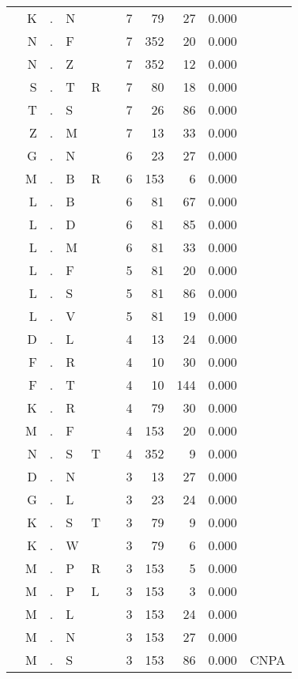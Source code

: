 \begin{longtable}{r@{ } r@{ } c@{ } l@{ } l@{ } l@{ } r r r r l }
  & K & . & N &   &   & 7 & 79 & 27 & 0.000 &  \\
  & N & . & F &   &   & 7 & 352 & 20 & 0.000 &  \\
  & N & . & Z &   &   & 7 & 352 & 12 & 0.000 &  \\
  & S & . & T & R &   & 7 & 80 & 18 & 0.000 &  \\
  & T & . & S &   &   & 7 & 26 & 86 & 0.000 &  \\
  & Z & . & M &   &   & 7 & 13 & 33 & 0.000 &  \\
  & G & . & N &   &   & 6 & 23 & 27 & 0.000 &  \\
  & M & . & B & R &   & 6 & 153 & 6 & 0.000 &  \\
  & L & . & B &   &   & 6 & 81 & 67 & 0.000 &  \\
  & L & . & D &   &   & 6 & 81 & 85 & 0.000 &  \\
  & L & . & M &   &   & 6 & 81 & 33 & 0.000 &  \\
  & L & . & F &   &   & 5 & 81 & 20 & 0.000 &  \\
  & L & . & S &   &   & 5 & 81 & 86 & 0.000 &  \\
  & L & . & V &   &   & 5 & 81 & 19 & 0.000 &  \\
  & D & . & L &   &   & 4 & 13 & 24 & 0.000 &  \\
  & F & . & R &   &   & 4 & 10 & 30 & 0.000 &  \\
  & F & . & T &   &   & 4 & 10 & 144 & 0.000 &  \\
  & K & . & R &   &   & 4 & 79 & 30 & 0.000 &  \\
  & M & . & F &   &   & 4 & 153 & 20 & 0.000 &  \\
  & N & . & S & T &   & 4 & 352 & 9 & 0.000 &  \\
  & D & . & N &   &   & 3 & 13 & 27 & 0.000 &  \\
  & G & . & L &   &   & 3 & 23 & 24 & 0.000 &  \\
  & K & . & S & T &   & 3 & 79 & 9 & 0.000 &  \\
  & K & . & W &   &   & 3 & 79 & 6 & 0.000 &  \\
  & M & . & P & R &   & 3 & 153 & 5 & 0.000 &  \\
  & M & . & P & L &   & 3 & 153 & 3 & 0.000 &  \\
  & M & . & L &   &   & 3 & 153 & 24 & 0.000 &  \\
  & M & . & N &   &   & 3 & 153 & 27 & 0.000 &  \\
  & M & . & S &   &   & 3 & 153 & 86 & 0.000 & \textsc{CNPA} \\

\end{longtable}
